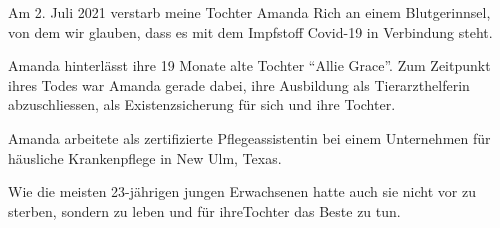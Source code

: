 Am 2. Juli 2021 verstarb meine Tochter Amanda Rich an einem Blutgerinnsel, von
dem wir glauben, dass es mit dem Impfstoff Covid-19 in Verbindung steht.

Amanda hinterlässt ihre 19 Monate alte Tochter “Allie Grace”. Zum Zeitpunkt
ihres Todes war Amanda gerade dabei, ihre Ausbildung als Tierarzthelferin
abzuschliessen, als Existenzsicherung für sich und ihre Tochter.

Amanda arbeitete als zertifizierte Pflegeassistentin bei einem Unternehmen für
häusliche Krankenpflege in New Ulm, Texas.

Wie die meisten 23-jährigen jungen Erwachsenen hatte auch sie nicht vor zu
sterben, sondern zu leben und für ihreTochter das Beste zu tun.

